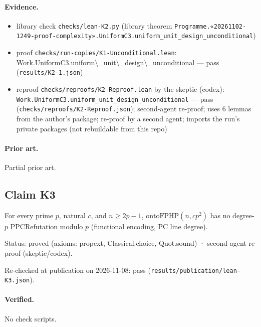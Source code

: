 \documentclass{article}
\begin{document}
\paragraph{Evidence.}
\begin{itemize}
\item library check \texttt{checks/lean-K2.py} (library theorem \texttt{Programme.«20261102-1249-proof-complexity».UniformC3.uniform\_unit\_design\_unconditional})
\item proof \texttt{checks/run-copies/K1-Unconditional.lean}: Work.UniformC3.uniform\textbackslash{}\_unit\textbackslash{}\_design\textbackslash{}\_unconditional --- pass (\texttt{results/K2-1.json})
\item reproof \texttt{checks/reproofs/K2-Reproof.lean} by the skeptic (codex): \texttt{Work.UniformC3.uniform\_unit\_design\_unconditional} --- pass (\texttt{checks/reproofs/K2-Reproof.json}); second-agent re-proof; uses 6 lemmas from the author's package; re-proof by a second agent; imports the run's private packages (not rebuildable from this repo)
\end{itemize}

\paragraph{Prior art.} Partial prior art.

\subsection*{Claim K3}

For every prime $p$, natural $c$, and $n\ge2p-1$, $\mathrm{ontoFPHP}(n,cp^2)$ has no degree-$p$ $\mathrm{PPCRefutation}$ modulo $p$ (functional encoding, PC line degree).

Status: proved (axioms: propext, Classical.choice, Quot.sound) · second-agent re-proof (skeptic/codex).

Re-checked at publication on 2026-11-08: pass (\texttt{results/publication/lean-K3.json}).

\paragraph{Verified.}
No check scripts.
\end{document}
